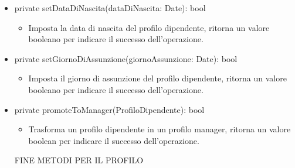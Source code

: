 \documentclass{report}
\begin{document}
\begin{itemize}
\item private  setDataDiNascita(dataDiNascita: Date): bool
\begin{itemize}
    \item Imposta la data di nascita del profilo dipendente, ritorna un valore booleano per indicare il successo dell'operazione.
\end{itemize}
\item private setGiornoDiAssunzione(giornoAssunzione: Date): bool
\begin{itemize}
    \item Imposta il giorno di assunzione del profilo dipendente, ritorna un valore booleano per indicare il successo dell'operazione.
\end{itemize}
\item private promoteToManager(ProfiloDipendente): bool
\begin{itemize}
    \item Trasforma un profilo dipendente in un profilo manager, ritorna un valore boolean per indicare il successo dell'operazione.
\end{itemize}
FINE METODI PER IL PROFILO
\fi

\end{itemize}
\end{document}
